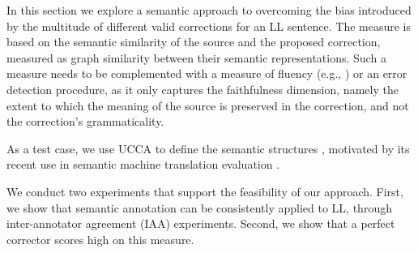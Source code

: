 \documentclass[letter,11pt]{article}
\begin{document}

In this section we explore a semantic approach to overcoming the bias
introduced by the multitude of different valid corrections for an LL sentence.
The measure is based on the semantic similarity of the source and the proposed correction,
measured as graph similarity between their semantic representations.
Such a measure needs to be complemented with a
measure of fluency (e.g., \cite{sakaguchi2016reassessing}) or an
error detection procedure, as it only captures
the faithfulness dimension, namely the extent to which
the meaning of the source is preserved in the correction,
and not the correction's grammaticality.

As a test case, we use UCCA to define the semantic structures \cite{abend2013universal}, motivated by
its recent use in semantic machine translation evaluation \cite{birch2016hume}.

We conduct two experiments that support the feasibility of our approach.
First, we show that semantic annotation can be consistently applied to LL,
through inter-annotator agreement (IAA) experiments.
Second, we show that a perfect corrector scores high on this measure.



\end{document}

